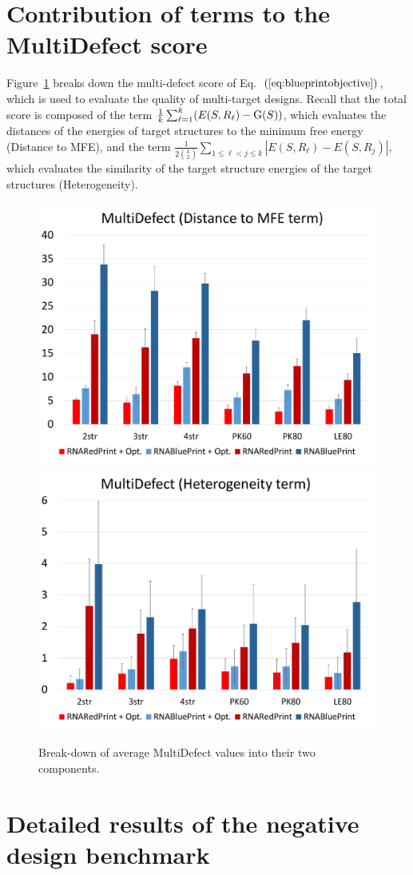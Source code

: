 \documentclass[10pt]{article}
\begin{document}
\section{Contribution of terms to the MultiDefect score}
\label{appsec:contributions-multidefect}
  
\newcommand{\EnsE}{\text{\rm G}} %


Figure~\ref{appfig:contributions-multidefect} breaks down the multi-defect
score of Eq.~$(\ref{eq:blueprintobjective})$, which is used to
evaluate the quality of multi-target designs. Recall that the total
score is composed of the term $\frac{1}{k} \sum_{\ell=1}^{k} (E(S,
R_\ell) - \EnsE(S))$, which evaluates the distances of the energies of
target structures to the minimum free energy (Distance to MFE), and
the term $\frac{1}{2\binom{k}{2}} \sum\limits_{1\leq\ell<j\leq
  k}|E(S,R_\ell) - E(S,R_j)|$, which evaluates the similarity of the
target structure energies of the target structures (Heterogeneity).

\begin{figure}[h!]
\includegraphics[width=.48\textwidth]{Figs/statistics-Term1}
\includegraphics[width=.48\textwidth]{Figs/statistics-Term2}
\caption{Break-down of average MultiDefect values into their two components.}
\label{appfig:contributions-multidefect}
\end{figure}



\section{Detailed results of the negative design benchmark}
\label{appsec:detailed-benchmark-results}
\end{document}
